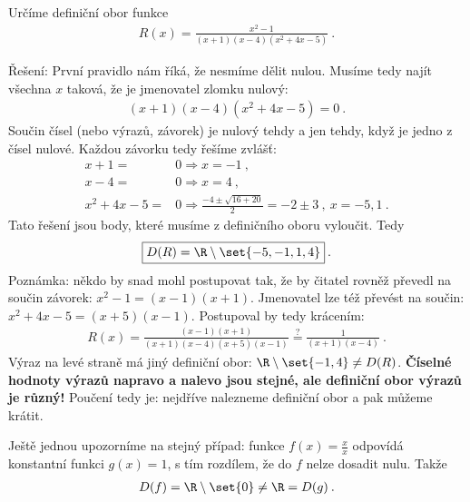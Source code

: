 \begin{example}
    Určíme definiční obor funkce \begin{align}
        R(x) = \frac{x^2-1}{(x+1)(x-4)(x^2 + 4x - 5)} \:.
    \end{align}

    Řešení: První pravidlo nám říká, že nesmíme dělit nulou. Musíme tedy najít všechna $x$ taková, že je jmenovatel zlomku nulový: \begin{align}
        (x+1)(x-4)(x^2 + 4x - 5) = 0 \:.
    \end{align}
    Součin čísel (nebo výrazů, závorek) je nulový tehdy a jen tehdy, když je jedno z čísel nulové. Každou závorku tedy řešíme zvlášť:
    \begin{align}
        x+1 =& 0 \Longrightarrow x = -1 \:, \\
        x-4 =& 0 \Longrightarrow x = 4 \:, \\
        x^2 + 4x - 5 =& 0 \Longrightarrow \frac{-4 \pm \sqrt{16+20}}{2} = - 2 \pm 3 \:, \: x = -5, 1 \:.
    \end{align}
    Tato řešení jsou body, které musíme z definičního oboru vyloučit. Tedy \begin{align}
        \boxed{D(R) = \R \setminus \set{-5,-1,1,4} }\:.
    \end{align}
    Poznámka: někdo by snad mohl postupovat tak, že by čitatel rovněž převedl na součin závorek: $x^2-1 = (x-1)(x+1)$. Jmenovatel lze též převést na součin: $x^2+4x-5 = (x+5)(x-1)$. Postupoval by tedy krácením:
    \begin{align}
        R(x) = \frac{(x-1)(x+1)}{(x+1)(x-4)(x+5)(x-1)} \overset{?}{=} \frac{1}{(x+1)(x-4)} \:.
    \end{align}
    Výraz na levé straně má jiný definiční obor: $\R \setminus \set{-1,4} \neq D(R)$.
    \textbf{Číselné hodnoty výrazů napravo a nalevo jsou stejné, ale definiční obor výrazů je různý!} Poučení tedy je: nejdříve nalezneme definiční obor a pak můžeme krátit.
\end{example}

\begin{example}
    Ještě jednou upozorníme na stejný případ: funkce $f(x) = \frac{x}{x}$ odpovídá konstantní funkci $g(x) = 1$, s tím rozdílem, že do $f$ nelze dosadit nulu. Takže \begin{align*}
        D(f) = \R \setminus \set{0} \neq \R = D(g) \:.
    \end{align*}
    
\end{example}

